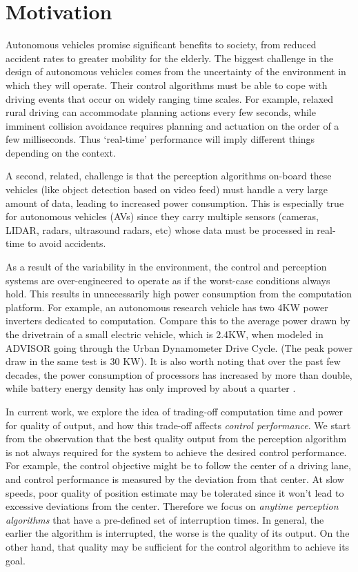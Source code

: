 \section{Motivation}
\label{sec:motivation}

Autonomous vehicles promise significant benefits to society, from reduced accident rates to greater mobility for the elderly. 
The biggest challenge in the design of autonomous vehicles comes from the uncertainty of the environment in which they will operate. 
Their control algorithms must be able to cope with driving events that occur on widely ranging time scales. 
For example, relaxed rural driving can accommodate planning actions every few seconds, while imminent collision avoidance requires planning and actuation on the order of a few milliseconds.
Thus `real-time' performance will imply different things depending on the context. 

A second, related, challenge is that the perception algorithms on-board these vehicles (like object detection based on video feed) must handle a very large amount of data, leading to increased power consumption. 
This is especially true for autonomous vehicles (AVs) since they carry multiple sensors (cameras, LIDAR, radars, ultrasound radars, etc) whose data must be processed in real-time to avoid accidents.

As a result of the variability in the environment, the control and perception systems are over-engineered to operate as if the worst-case conditions always hold. 
This results in unnecessarily high power consumption from the computation platform. 
For example, an autonomous research vehicle has two 4KW power inverters dedicated to computation.
Compare this to the average power drawn by the drivetrain of a small electric vehicle, which is 2.4KW, when modeled  in ADVISOR \cite{nreladvisor} going through the Urban Dynamometer Drive Cycle.
(The peak power draw in the same test is 30 KW).
It is also worth noting that over the past few decades, the power consumption of processors has increased by more than double, while battery energy density has only improved by about a quarter \cite{Lahiri}. 

In current work, we explore the idea of trading-off computation time and power for quality of output, and how this trade-off affects \emph{control performance}.
We start from the observation that the best quality output from the perception algorithm is not always required for the system to achieve the desired control performance.
For example, the control objective might be to follow the center of a driving lane, and control performance is measured by the deviation from that center.
At slow speeds, poor quality of position estimate may be tolerated since it won't lead to excessive deviations from the center.
Therefore we focus on \emph{anytime perception algorithms} that have a pre-defined set of interruption times. 
In general, the earlier the algorithm is interrupted, the worse is the quality of its output. 
On the other hand, that quality may be sufficient for the control algorithm to achieve its goal.

